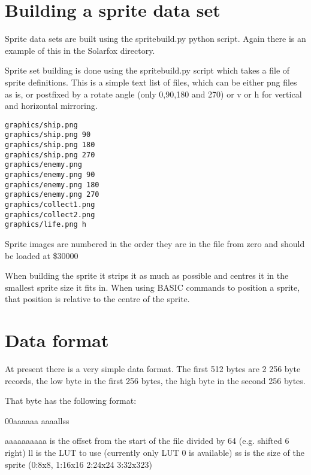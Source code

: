 \section{Building a sprite data set}
	
Sprite data sets are built using the spritebuild.py python script. Again there is an example of this in the Solarfox directory.

Sprite set building is done using the spritebuild.py script which takes a file of sprite definitions. This is a simple text list of files, which can be either png files as is, or postfixed by a rotate angle (only 0,90,180 and 270) or v or h for vertical and horizontal mirroring.

\begin{verbatim}
graphics/ship.png
graphics/ship.png 90
graphics/ship.png 180
graphics/ship.png 270
graphics/enemy.png
graphics/enemy.png 90
graphics/enemy.png 180
graphics/enemy.png 270
graphics/collect1.png
graphics/collect2.png
graphics/life.png h
\end{verbatim}

Sprite images are numbered in the order they are in the file from zero and should be loaded at \$30000

When building the sprite it strips it as much as possible and centres it in the smallest sprite size it fits in. When using BASIC commands to position a sprite, that position is relative to the centre of the sprite.

\section{Data format}

At present there is a very simple data format. The first 512 bytes are 2 256 byte records, the low byte in the first 256 bytes, the high byte in the second 256 bytes.

That byte has the following format:

00aaaaaa aaaallss

aaaaaaaaaa is the offset from the start of the file divided by 64 (e.g. shifted 6 right)
ll is the LUT to use (currently only LUT 0 is available)
ss is the size of the sprite (0:8x8, 1:16x16 2:24x24 3:32x323)